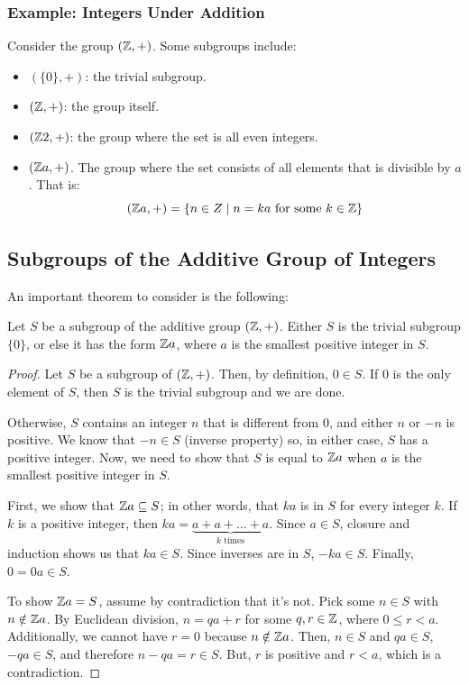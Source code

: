 \documentclass[letterpaper]{article}
\begin{document}
\subsubsection{Example: Integers Under Addition}
Consider the group $(\mathbb{Z}, +)$. Some subgroups include: 
\begin{itemize}
    \item $(\{0\}, +)$: the trivial subgroup.
    \item $(\mathbb{Z}, +)$: the group itself.
    \item $(\mathbb{Z} 2, +)$: the group where the set is all even integers. 
    \item $(\mathbb{Z} a, +)$. The group where the set consists of all elements that is divisible by $a$. That is: 
    \[(\mathbb{Z} a, +) = \{n \in Z \mid n = ka \text{ for some } k \in \mathbb{Z}\}\] 
\end{itemize}

\subsection{Subgroups of the Additive Group of Integers}
An important theorem to consider is the following: 
\begin{theorem}{}{}
    Let $S$ be a subgroup of the additive group $(\mathbb{Z}, +)$. Either $S$ is the trivial subgroup $\{0\}$, or else it has the form $\mathbb{Z} a$, where $a$ is the smallest positive integer in $S$. 
\end{theorem}

\begin{mdframed}
    \begin{proof}
        Let $S$ be a subgroup of $(\mathbb{Z}, +)$. Then, by definition, $0 \in S$. If 0 is the only element of $S$, then $S$ is the trivial subgroup and we are done. 

        \bigskip 

        Otherwise, $S$ contains an integer $n$ that is different from 0, and either $n$ or $-n$ is positive. We know that $-n \in S$ (inverse property) so, in either case, $S$ has a positive integer. Now, we need to show that $S$ is equal to $\mathbb{Z} a$ when $a$ is the smallest positive integer in $S$. 

        \bigskip 

        First, we show that $\mathbb{Z} a \subseteq S$; in other words, that $ka$ is in $S$ for every integer $k$. If $k$ is a positive integer, then $ka = \underbrace{a + a + \dots + a}_{k \text{ times}}$. Since $a \in S$, closure and induction shows us that $ka \in S$. Since inverses are in $S$, $-ka \in S$. Finally, $0 = 0a \in S$. 

        \bigskip 

        To show $\mathbb{Z} a = S$, assume by contradiction that it's not. Pick some $n \in S$ with $n \notin \mathbb{Z} a$. By Euclidean division, $n = qa + r$ for some $q, r \in \mathbb{Z}$, where $0 \leq r < a$. Additionally, we cannot have $r = 0$ because $n \notin \mathbb{Z} a$. Then, $n \in S$ and $qa \in S$, $-qa \in S$, and therefore $n - qa = r \in S$. But, $r$ is positive and $r < a$, which is a contradiction. \qedhere  
    \end{proof}
\end{mdframed}
\end{document}
